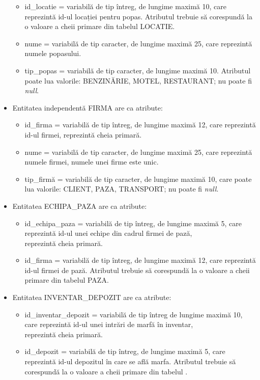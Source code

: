 \documentclass[12pt, a4paper]{article}
\begin{document}
\begin{itemize}
\begin{itemize}
            \item id\_locatie = variabilă de tip întreg, de lungime maximă 10, care reprezintă id-ul locației pentru popas. Atributul trebuie să corespundă la o valoare a cheii primare din tabelul LOCATIE.
            \item nume = variabilă de tip caracter, de lungime maximă 25, care reprezintă numele popasului.
            \item tip\_popas = variabilă de tip caracter, de lungime maximă 10. Atributul poate lua valorile: BENZINĂRIE, MOTEL, RESTAURANT; nu poate fi \emph{null}.
        \end{itemize}
    \item Entitatea independentă FIRMA are ca atribute:
        \begin{itemize}
            \item id\_firma = variabilă de tip întreg, de lungime maximă 12, care reprezintă id-ul firmei, reprezintă cheia primară.
            \item nume = variabilă de tip caracter, de lungime maximă 25, care reprezintă numele firmei, numele unei firme este unic.
            \item tip\_firmă = variabilă de tip caracter, de lungime maximă 10, care poate lua valorile: CLIENT, PAZA, TRANSPORT; nu poate fi \emph{null}.
        \end{itemize}
    \item Entitatea ECHIPA\_PAZA are ca atribute:
        \begin{itemize}
            \item id\_echipa\_paza = variabilă de tip întreg, de lungime maximă 5, care reprezintă id-ul unei echipe din cadrul firmei de pază, \\reprezintă cheia primară.
            \item id\_firma = variabilă de tip întreg, de lungime maximă 12, care reprezintă id-ul firmei de pază. Atributul trebuie să corespundă la o valoare a cheii primare din tabelul PAZA.
        \end{itemize}
    \item Entitatea INVENTAR\_DEPOZIT are ca atribute:
        \begin{itemize}
            \item id\_inventar\_depozit = variabilă de tip întreg de lungime maximă 10, care reprezintă id-ul unei intrări de marfă în inventar, \\reprezintă cheia primară.
            \item id\_depozit = variabilă de tip întreg, de lungime maximă 5, care reprezintă id-ul depozitul în care se află marfa. Atributul trebuie să corespundă la o valoare a cheii primare din tabelul .

\end{itemize}
\end{itemize}
\end{document}
